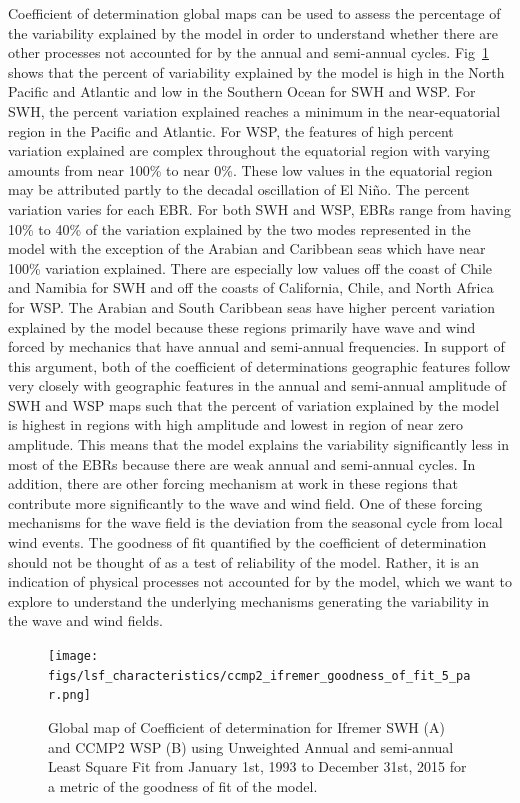 \documentclass[draft,linenumbers]{agujournal2018}
\begin{document}
Coefficient of determination global maps can be used to assess the percentage of the variability explained by the model in order to understand whether there are other processes not accounted for by the annual and semi-annual cycles.  Fig~\ref{Ifremer_ccmp2_lsf_gof} shows that the percent of variability explained by the model is high in the North Pacific and Atlantic and low in the Southern Ocean for SWH and WSP. For SWH, the percent variation explained reaches a minimum in the near-equatorial region in the Pacific and Atlantic. For WSP, the features of high percent variation explained are complex throughout the equatorial region with varying amounts from near 100\% to near 0\%. These low values in the equatorial region may be attributed partly to the decadal oscillation of El Ni\~no. The percent variation varies for each EBR. For both SWH and WSP, EBRs range from having 10\% to 40\% of the variation explained by the two modes represented in the model with the exception of the Arabian and Caribbean seas which have near 100\% variation explained. There are especially low values off the coast of Chile and Namibia for SWH and off the coasts of California, Chile, and North Africa for WSP. The Arabian and South Caribbean seas have higher percent variation explained by the model because these regions primarily have wave and wind forced by mechanics that have annual and semi-annual frequencies. In support of this argument, both of the coefficient of determinations geographic features follow very closely with geographic features in the annual and semi-annual amplitude of SWH and WSP maps such that the percent of variation explained by the model is highest in regions with high amplitude and lowest in region of near zero amplitude. This means that the model explains the variability significantly less in most of the EBRs because there are  weak annual and semi-annual cycles. In addition, there are other forcing mechanism at work in these regions that contribute more significantly to the wave and wind field. One of these forcing mechanisms for the wave field is the deviation from the seasonal cycle from local wind events. The goodness of fit quantified by the coefficient of determination should not be thought of as a test of reliability of the model. Rather, it is an indication of physical processes not accounted for by the model, which we want to explore to understand the underlying mechanisms generating the variability in the wave and wind fields. 

\begin{figure}[tbh]
\centering
\texttt{[image: figs/lsf\_characteristics/ccmp2\_ifremer\_goodness\_of\_fit\_5\_par.png]}
\caption{Global map of Coefficient of determination for Ifremer SWH (A) and CCMP2 WSP (B) using Unweighted Annual and semi-annual Least Square Fit from January 1st, 1993 to December 31st, 2015 for a metric of the goodness of fit of the model.}
\label{Ifremer_ccmp2_lsf_gof}
\end{figure}
\end{document}
